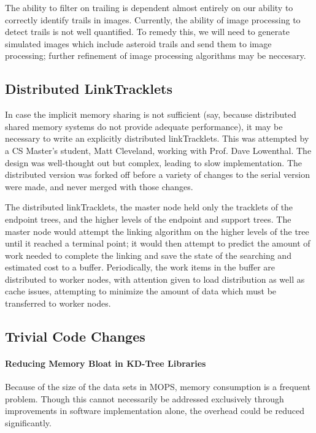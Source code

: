 The ability to filter on trailing is dependent almost entirely on our
ability to correctly identify trails in images.  Currently, the
ability of image processing to detect trails is not well quantified.  To
remedy this, we will need to generate simulated images which include
asteroid trails and send them to image processing; further refinement
of image processing algorithms may be neccesary.


\subsection{Distributed LinkTracklets} 

In case the implicit memory sharing is not sufficient (say, because
distributed shared memory systems do not provide adequate
performance), it may be necessary to write an explicitly distributed
linkTracklets.  This was attempted by a CS Master's student, Matt
Cleveland, working with Prof. Dave Lowenthal.  The design was
well-thought out but complex, leading to slow implementation.  The
distributed version was forked off before a variety of changes to the
serial version were made, and never merged with those changes.

The distributed linkTracklets, the master node held only the tracklets
of the endpoint trees, and the higher levels of the endpoint and
support trees.  The master node would attempt the linking algorithm on
the higher levels of the tree until it reached a terminal point; it
would then attempt to predict the amount of work needed to complete
the linking and save the state of the searching and estimated cost to
a buffer.  Periodically, the work items in the buffer are distributed
to worker nodes, with attention given to load distribution as well as
cache issues, attempting to minimize the amount of data which must be
transferred to worker nodes.


\subsection{Trivial Code Changes}
\paragraph{Reducing Memory Bloat in KD-Tree Libraries}

Because of the size of the data sets in MOPS, memory consumption is a
frequent problem.  Though this cannot necessarily be addressed
exclusively through improvements in software implementation alone, the
overhead could be reduced significantly.

